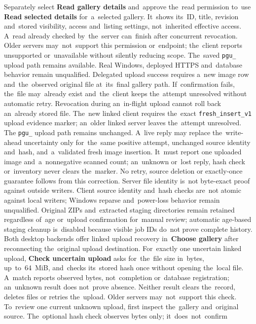 \documentclass[11pt,a4paper]{article}
\newcommand{\ui}[1]{\textbf{#1}}
\begin{document}
Separately select \ui{Read gallery details} and~approve the~read permission
to~use \ui{Read selected details} for~a~selected gallery. It~shows its~ID,
title, revision and~stored visibility, access and~listing settings, not~inherited
effective access. A~read already checked by~the~server can~finish
after concurrent revocation. Older servers may~not~support this permission
or~endpoint; the~client reports unsupported or~unavailable without silently
reducing scope. The~saved \texttt{pgu\_} upload path remains available. Real
Windows, deployed HTTPS and~database behavior remain unqualified.
Delegated upload success requires a~new image row and~the~observed original
file at~its~final gallery path. If~confirmation fails, the~file may~already
exist and~the~client keeps the~attempt unresolved without automatic retry.
Revocation during an~in-flight upload cannot roll back an~already stored file.
The~new linked client requires the~exact \texttt{fresh\_insert\_v1} upload
evidence marker; an~older linked server leaves the~attempt unresolved. The
\texttt{pgu\_} upload path remains unchanged.
A~live reply may replace the~write-ahead uncertainty only for~the~same
positive attempt, unchanged
source identity and~hash, and~a~validated fresh image insertion. It~must report
one uploaded image and~a~nonnegative scanned count; an~unknown or~lost reply,
hash check or~inventory never clears the~marker. No retry, source deletion or
exactly-once guarantee follows from this correction.
Server file identity is~not byte-exact proof against outside writers. Client
source identity and~hash checks are~not atomic against local writers; Windows
reparse and~power-loss behavior remain unqualified.
Original ZIPs and~extracted staging directories remain retained regardless
of~age or~upload confirmation for~manual review; automatic age-based staging
cleanup is~disabled because visible job IDs do~not prove complete history.
Both desktop backends offer linked upload recovery in~\ui{Choose gallery}
after reconnecting the~original upload destination.
For~exactly one uncertain linked upload, \ui{Check uncertain upload} asks
for~the~file size in~bytes, up~to~64~MiB, and~checks its~stored hash once
without opening the~local file. A~match reports
observed bytes, not~completion or~database registration; an~unknown result
does not~prove absence. Neither result clears the~record, deletes files or
retries the~upload. Older servers may~not~support this check.
To~review one current unknown upload, first inspect the~gallery and~original
source. The~optional hash check observes bytes only; it~does~not~confirm
\end{document}
